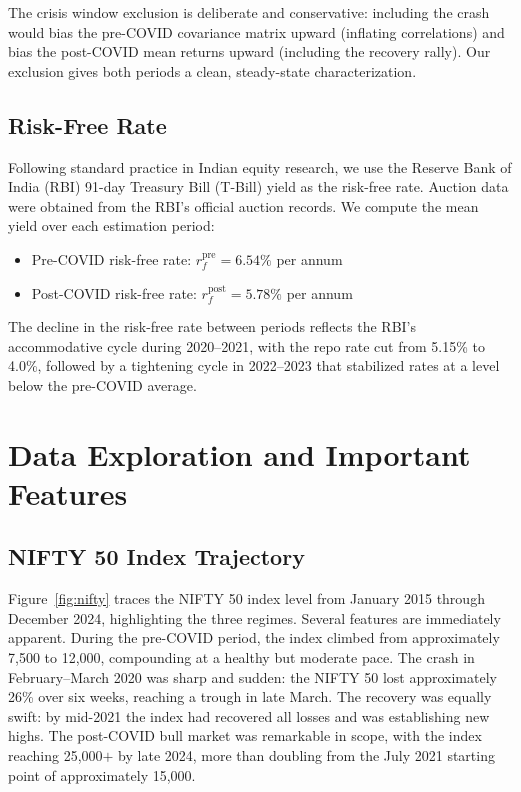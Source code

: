 \documentclass[12pt,a4paper]{article}
\begin{document}
The crisis window exclusion is deliberate and conservative: including the crash would
bias the pre-COVID covariance matrix upward (inflating correlations) and bias the
post-COVID mean returns upward (including the recovery rally). Our exclusion gives both
periods a clean, steady-state characterization.

\subsection{Risk-Free Rate}

Following standard practice in Indian equity research, we use the Reserve Bank of India
(RBI) 91-day Treasury Bill (T-Bill) yield as the risk-free rate. Auction data were
obtained from the RBI's official auction records. We compute the mean yield over each
estimation period:

\begin{itemize}
    \item Pre-COVID risk-free rate: $r_f^{\text{pre}} = 6.54\%$ per annum
    \item Post-COVID risk-free rate: $r_f^{\text{post}} = 5.78\%$ per annum
\end{itemize}

The decline in the risk-free rate between periods reflects the RBI's accommodative cycle
during 2020--2021, with the repo rate cut from 5.15\% to 4.0\%, followed by a tightening
cycle in 2022--2023 that stabilized rates at a level below the pre-COVID average.

\section{Data Exploration and Important Features}
\label{sec:exploration}

\subsection{NIFTY 50 Index Trajectory}

Figure~\ref{fig:nifty} traces the NIFTY 50 index level from January 2015 through
December 2024, highlighting the three regimes. Several features are immediately apparent.
During the pre-COVID period, the index climbed from approximately 7,500 to 12,000,
compounding at a healthy but moderate pace. The crash in February--March 2020 was sharp
and sudden: the NIFTY 50 lost approximately 26\% over six weeks, reaching a trough in
late March. The recovery was equally swift: by mid-2021 the index had recovered all
losses and was establishing new highs. The post-COVID bull market was remarkable in scope,
with the index reaching 25,000$+$ by late 2024, more than doubling from the July 2021
starting point of approximately 15,000.
\end{document}
